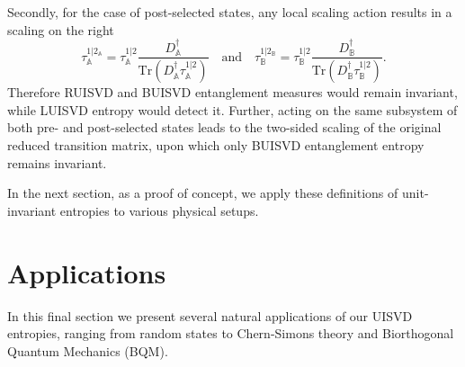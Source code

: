 \documentclass[11pt,a4paper]{article}
\newcommand{\Tr}{\text{Tr}}
\begin{document}
Secondly, for the case of post-selected states, any local scaling action results in a scaling on the right 
\begin{equation}
\tau^{1|2_\mathbb{A}}_\mathbb{A}= \tau^{1|2}_\mathbb{A}{{\frac{D_\mathbb{A}^\dagger}{\Tr{(D_\mathbb{A}^\dagger\tau_\mathbb{A}^{1|2})}}}} \quad \text{and} \quad \tau^{1|2_\mathbb{B}}_\mathbb{B}= \tau^{1|2}_\mathbb{B} {{\frac{D^\dagger_\mathbb{B}}{\Tr{(D_\mathbb{B}^\dagger\tau_\mathbb{B}^{1|2})}}}}.
\end{equation}
Therefore RUISVD and BUISVD entanglement measures would remain invariant, while LUISVD entropy would detect it. Further, acting on the same subsystem of both pre- and post-selected states leads to the two-sided scaling of the original reduced transition matrix, upon which only BUISVD entanglement entropy remains invariant. 

In the next section, as a proof of concept, we apply these definitions of unit-invariant entropies to various physical setups.
\section{Applications}\label{sec:Applications}
In this final section we present several natural applications of our UISVD entropies, ranging from random states to Chern-Simons theory and Biorthogonal Quantum Mechanics (BQM).
\end{document}
